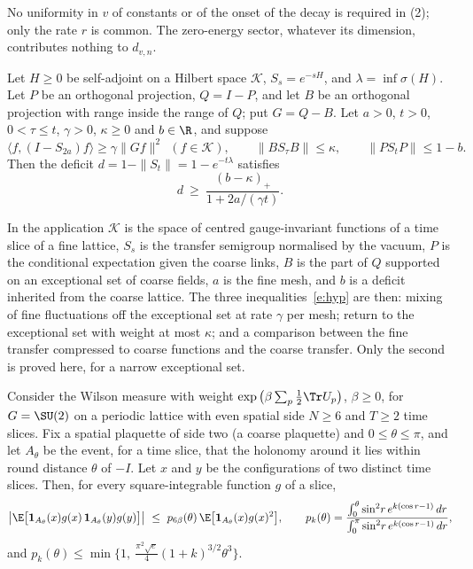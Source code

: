 No uniformity in $v$ of constants or of the onset of the decay is required in (2); only the rate $r$ is
common. The zero-energy sector, whatever its dimension, contributes nothing to $d_{v,n}$.

\begin{theorem}\label{t:inh}
Let $H\ge0$ be self-adjoint on a Hilbert space $\mathcal K$, $S_s=e^{-sH}$, and $\lambda=\inf\sigma(H)$. Let
$P$ be an orthogonal projection, $Q=I-P$, and let $B$ be an orthogonal projection with range inside the range
of $Q$; put $G=Q-B$. Let $a>0$, $t>0$, $0<\tau\le t$, $\gamma>0$, $\kappa\ge0$ and $b\in\R$, and suppose
\begin{equation}\label{e:hyp}
\langle f,(I-S_{2a})f\rangle\ge\gamma\|Gf\|^2\ \ (f\in\mathcal K),\qquad
\|BS_\tau B\|\le\kappa,\qquad \|PS_tP\|\le1-b .
\end{equation}
Then the deficit $d=1-\|S_t\|=1-e^{-t\lambda}$ satisfies
\begin{equation}\label{e:inh}
d\ \ge\ \frac{(b-\kappa)_+}{1+2a/(\gamma t)} .
\end{equation}
\end{theorem}

In the application $\mathcal K$ is the space of centred gauge-invariant functions of a time slice of a fine
lattice, $S_s$ is the transfer semigroup normalised by the vacuum, $P$ is the conditional expectation given
the coarse links, $B$ is the part of $Q$ supported on an exceptional set of coarse fields, $a$ is the fine
mesh, and $b$ is a deficit inherited from the coarse lattice. The three inequalities~\eqref{e:hyp} are then:
mixing of fine fluctuations off the exceptional set at rate $\gamma$ per mesh; return to the exceptional set
with weight at most $\kappa$; and a comparison between the fine transfer compressed to coarse functions and
the coarse transfer. Only the second is proved here, for a narrow exceptional set.

\begin{theorem}\label{t:ret}
Consider the Wilson measure with weight $\exp\big(\beta\sum_p\tfrac12\Tr U_p\big)$, $\beta\ge0$, for $G=\SU(2)$
on a periodic lattice with even spatial side $N\ge6$ and $T\ge2$ time slices. Fix a spatial
plaquette of side two (a coarse plaquette) and $0\le\theta\le\pi$, and let $A_\theta$ be the event, for a time
slice, that the holonomy around it lies within round distance $\theta$ of $-I$. Let $x$ and $y$ be the
configurations of two distinct time slices. Then, for every square-integrable function $g$ of a slice,
\begin{equation}\label{e:ret}
\big|\E\big[\mathbf 1_{A_\theta}(x)g(x)\,\mathbf 1_{A_\theta}(y)g(y)\big]\big|\ \le\ p_{6\beta}(\theta)\,
\E\big[\mathbf 1_{A_\theta}(x)g(x)^2\big],
\qquad
p_k(\theta)=\frac{\int_0^\theta\sin^2\!r\,e^{k(\cos r-1)}\,dr}{\int_0^\pi\sin^2\!r\,e^{k(\cos r-1)}\,dr},
\end{equation}
and $p_k(\theta)\le\min\{1,\ \tfrac{\pi^2\sqrt e}{4}(1+k)^{3/2}\theta^3\}$.
\end{theorem}

